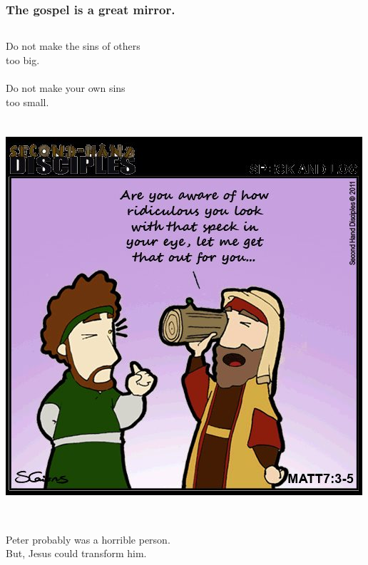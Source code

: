 \documentclass{beamer}
\begin{document}
\begin{frame}
\frametitle{The gospel is a great mirror.}
\begin{columns}
\column{5cm}
Do not make the sins of others\\too big.\\~\\
Do not make your own sins\\too small.\\~\\~\\
\column{5cm}
\includegraphics[width=\textwidth]{graphics/beam.jpg}\\
\end{columns}
~\\Peter probably was a horrible person.\\
But, Jesus could transform him.
\end{frame}
\end{document}

